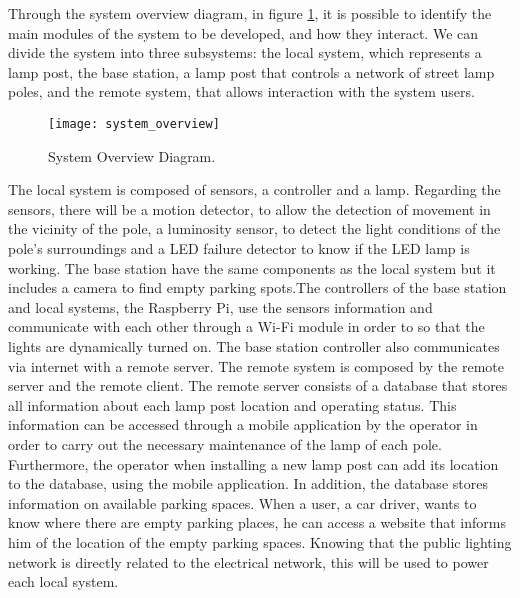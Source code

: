 Through the system overview diagram, in figure \ref{fig:system_overview}, it is possible to identify the main modules of the system to be developed, and how they interact. We can divide the system into three subsystems: the local system, which represents a lamp post, the base station, a lamp post that controls a network of street lamp poles, and the remote system, that allows interaction with the system users.
\begin{figure}[ht]
        \centering
        \texttt{[image: system\_overview]}
        \caption{System Overview Diagram.}
        \label{fig:system_overview}
\end{figure}

The local system is composed of sensors, a controller and a lamp. Regarding the sensors, there will be a motion detector, to allow the detection of movement in the vicinity of the pole, a luminosity sensor, to detect the light conditions of the pole’s surroundings and a LED failure detector to know if the LED lamp is working. The base station have the same components as the local system but it includes a camera to find empty parking spots.The controllers of the base station and local systems, the Raspberry Pi, use the sensors information and communicate with each other through a Wi-Fi module in order to so that the lights are dynamically turned on. The base station controller also communicates via internet with a remote server.
The remote system is composed by the remote server and the remote client. The remote server consists of a database that stores all information about each lamp post location and operating status. This information can be accessed through a mobile application by the operator in order to carry out the necessary maintenance of the lamp of each pole. Furthermore, the operator when installing a new lamp post can add its location to the database, using the mobile application. In addition, the database stores information on available parking spaces. When a user, a car driver, wants to know where there are empty parking places, he can access a website that informs him of the location of the empty parking spaces.
Knowing that the public lighting network is directly related to the electrical network, this will be used to power each local system.

